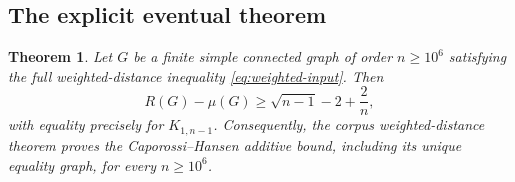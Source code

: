 \documentclass[11pt,a4paper]{article}
\newtheorem{theorem}{Theorem}[section]
\theoremstyle{remark}\newtheorem{remark}[theorem]{Remark}
\begin{document}
\subsection{The explicit eventual theorem}

\begin{theorem}\label{thm:ch-million}
Let $G$ be a finite simple connected graph of order $n\ge10^6$
satisfying the full weighted-distance inequality \eqref{eq:weighted-input}.
Then
\begin{equation}\label{eq:chm-conclusion}
 R(G)-\mu(G)\ge\sqrt{n-1}-2+\frac2n,
\end{equation}
with equality precisely for $K_{1,n-1}$. Consequently, the corpus
weighted-distance theorem proves the Caporossi--Hansen additive
bound, including its unique equality graph, for every $n\ge10^6$.
\end{theorem}
\end{document}
